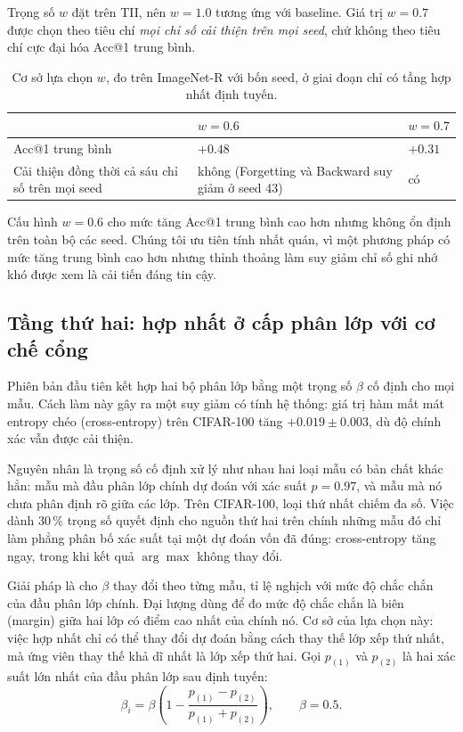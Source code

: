 \documentclass[11pt,a4paper]{article}
\begin{document}
Trọng số $w$ đặt trên TII, nên $w = 1.0$ tương ứng với baseline. Giá trị $w = 0.7$
được chọn theo tiêu chí \emph{mọi chỉ số cải thiện trên mọi seed}, chứ không theo
tiêu chí cực đại hóa Acc@1 trung bình.

\begin{table}[htbp]
\centering
\caption{Cơ sở lựa chọn $w$, đo trên ImageNet-R với bốn seed, ở giai đoạn chỉ có
tầng hợp nhất định tuyến.}
\label{tab:choose-w}
\begin{tabular}{@{}p{5.4cm}p{4.6cm}p{2.6cm}@{}}
\toprule
 & $w = 0.6$ & $w = 0.7$ \\
\midrule
Acc@1 trung bình & $+0.48$ & $+0.31$ \\
Cải thiện đồng thời cả sáu chỉ số trên mọi seed
  & không (Forgetting và Backward suy giảm ở seed 43) & có \\
\bottomrule
\end{tabular}
\end{table}

Cấu hình $w = 0.6$ cho mức tăng Acc@1 trung bình cao hơn nhưng không ổn định trên
toàn bộ các seed. Chúng tôi ưu tiên tính nhất quán, vì một phương pháp có mức
tăng trung bình cao hơn nhưng thỉnh thoảng làm suy giảm chỉ số ghi nhớ khó được
xem là cải tiến đáng tin cậy.

\subsection{Tầng thứ hai: hợp nhất ở cấp phân lớp với cơ chế cổng}
\label{sec:stage2}

Phiên bản đầu tiên kết hợp hai bộ phân lớp bằng một trọng số $\beta$ cố định cho
mọi mẫu. Cách làm này gây ra một suy giảm có tính hệ thống: giá trị hàm mất mát
entropy chéo (cross-entropy) trên CIFAR-100 tăng $+0.019 \pm 0.003$, dù độ chính
xác vẫn được cải thiện.

Nguyên nhân là trọng số cố định xử lý như nhau hai loại mẫu có bản chất khác
hẳn: mẫu mà đầu phân lớp chính dự đoán với xác suất $p = 0.97$, và mẫu mà nó
chưa phân định rõ giữa các lớp. Trên CIFAR-100, loại thứ nhất chiếm đa số. Việc
dành $30\,\%$ trọng số quyết định cho nguồn thứ hai trên chính những mẫu đó chỉ
làm phẳng phân bố xác suất tại một dự đoán vốn đã đúng: cross-entropy tăng ngay,
trong khi kết quả $\arg\max$ không thay đổi.

Giải pháp là cho $\beta$ thay đổi theo từng mẫu, tỉ lệ nghịch với mức độ chắc
chắn của đầu phân lớp chính. Đại lượng dùng để đo mức độ chắc chắn là biên
(margin) giữa hai lớp có điểm cao nhất của chính nó. Cơ sở của lựa chọn này:
việc hợp nhất chỉ có thể thay đổi dự đoán bằng cách thay thế lớp xếp thứ nhất,
mà ứng viên thay thế khả dĩ nhất là lớp xếp thứ hai. Gọi $p_{(1)}$ và $p_{(2)}$
là hai xác suất lớn nhất của đầu phân lớp sau định tuyến:
\begin{equation}
\beta_i = \beta \left( 1 - \frac{p_{(1)} - p_{(2)}}{p_{(1)} + p_{(2)}} \right),
\qquad \beta = 0.5 .
\label{eq:gate}
\end{equation}
\end{document}
